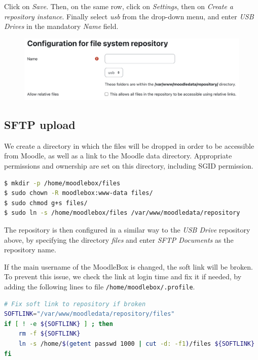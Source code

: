 \documentclass[12pt]{article}
\begin{document}
Click on \emph{Save}.
Then, on the same row, click on \emph{Settings}, then on \emph{Create a repository instance}.
Finally select \emph{usb} from the drop-down menu, and enter \emph{USB Drives} in the mandatory \emph{Name} field.
\begin{figure}[!ht]
\begin{minipage}[b]{\linewidth}\centering
\includegraphics[width=13cm]{repo-filesystem-usb-2.png}
\end{minipage}
\end{figure}

\subsection{SFTP upload}

We create a directory in which the files will be dropped in order to be accessible from Moodle, as well as a link to the Moodle data directory.
Appropriate permissions and ownership are set on this directory, including SGID permission.

\begin{lstlisting}[language=bash]
$ mkdir -p /home/moodlebox/files
$ sudo chown -R moodlebox:www-data files/
$ sudo chmod g+s files/
$ sudo ln -s /home/moodlebox/files /var/www/moodledata/repository
\end{lstlisting}

The repository is then configured in a similar way to the \textsl{USB Drive} repository above, by specifying the directory \emph{files} and enter \emph{SFTP Documents} as the repository name.

If the main username of the MoodleBox is changed, the soft link will be broken.
To prevent this issue, we check the link at login time and fix it if needed, by adding the following lines to file \lstinline{/home/moodlebox/.profile}.

\begin{lstlisting}[language=bash]
# Fix soft link to repository if broken
SOFTLINK="/var/www/moodledata/repository/files"
if [ ! -e ${SOFTLINK} ] ; then
    rm -f ${SOFTLINK}
    ln -s /home/$(getent passwd 1000 | cut -d: -f1)/files ${SOFTLINK}
fi
\end{lstlisting}
\end{document}
